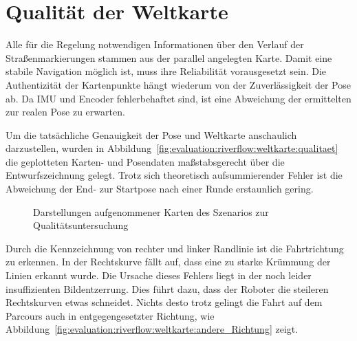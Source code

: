 \section{Qualität der Weltkarte  \dcfirstauthorshort}
\label{ssec:evaluation:messungen:weltkarte}
Alle für die Regelung notwendigen Informationen über den Verlauf der Straßenmarkierungen stammen aus der parallel angelegten Karte. Damit eine stabile Navigation möglich ist, muss ihre Reliabilität vorausgesetzt sein. Die Authentizität der Kartenpunkte hängt wiederum von der Zuverlässigkeit der Pose ab. Da IMU und Encoder fehlerbehaftet sind, ist eine Abweichung der ermittelten zur realen Pose zu erwarten. 

Um die tatsächliche Genauigkeit der Pose und Weltkarte anschaulich darzustellen, wurden in Abbildung~\ref{fig:evaluation:riverflow:weltkarte:qualitaet} die geplotteten Karten- und Posendaten maßstabsgerecht über die Entwurfszeichnung gelegt. Trotz sich theoretisch aufsummierender Fehler ist die Abweichung der End- zur Startpose nach einer Runde erstaunlich gering.

\begin{figure}[htbp] %
	\centering
	
	\hfill
	\caption{Darstellungen aufgenommener Karten des Szenarios zur Qualitätsuntersuchung}
	
\end{figure} 

Durch die Kennzeichnung von rechter und linker Randlinie ist die Fahrtrichtung zu erkennen. In der Rechtskurve fällt auf, dass eine zu starke Krümmung der Linien erkannt wurde. Die Ursache dieses Fehlers liegt in der noch leider insuffizienten Bildentzerrung. Dies führt dazu, dass der Roboter die steileren Rechtskurven etwas schneidet. Nichts desto trotz gelingt die Fahrt auf dem Parcours auch in entgegengesetzter Richtung, wie Abbildung~\ref{fig:evaluation:riverflow:weltkarte:andere_Richtung} zeigt.